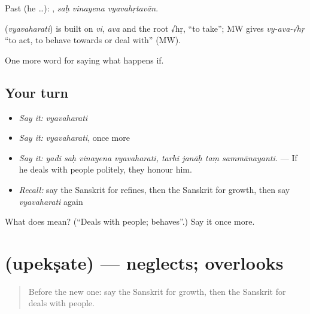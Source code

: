 Past (he …):   , \emph{saḥ vinayena vyavahṛtavān}.

\begin{cousinweb}
\textbf{} (\emph{vyavaharati}) is built on \emph{vi}, \emph{ava} and the root √hṛ, \textquotedblleft{}to take\textquotedblright{}; MW gives \emph{vy-ava-√hṛ} \textquotedblleft{}to act, to behave towards or deal with\textquotedblright{} (MW).
\end{cousinweb}

\begin{grammarlens}[title={What you've built}]
One more word for saying what happens if.
\end{grammarlens}

\subsection*{Your turn}
\begin{itemize}
\raggedright
  \item \emph{Say it:} \emph{vyavaharati}
  \item \emph{Say it:} \emph{vyavaharati}, once more
  \item \emph{Say it:} \emph{yadi saḥ vinayena vyavaharati, tarhi janāḥ taṃ sammānayanti.} — If he deals with people politely, they honour him.
  \item \emph{Recall:} say the Sanskrit for refines, then the Sanskrit for growth, then say \emph{vyavaharati} again
\end{itemize}

\begin{tcolorbox}[breakable,colback=teal!4,colframe=teal!35!black,title={Before you move on}]
What does  mean? (\textquotedblleft{}Deals with people; behaves\textquotedblright{}.) Say it once more.
\end{tcolorbox}
\section[\texorpdfstring{\sk{उपेक्षते} (upekṣate)}{उपेक्षते (upekṣate)}]{ (upekṣate) — neglects; overlooks}

\label{lesson:SA-C388-upeksate}



\begin{quote}
Before the new one: say the Sanskrit for growth, then the Sanskrit for deals with people.
\end{quote}

